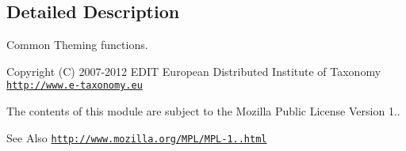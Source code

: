 \subsection{Detailed Description}
Common Theming functions.

\begin{DoxyCopyright}{Copyright}
(C) 2007-\/2012 E\-D\-I\-T European Distributed Institute of Taxonomy \href{http://www.e-taxonomy.eu}{\tt http\-://www.\-e-\/taxonomy.\-eu}
\end{DoxyCopyright}
The contents of this module are subject to the Mozilla Public License Version 1.. \begin{DoxySeeAlso}{See Also}
\href{http://www.mozilla.org/MPL/MPL-1.1.html}{\tt http\-://www.\-mozilla.\-org/\-M\-P\-L/\-M\-P\-L-\/1..\-html} 
\end{DoxySeeAlso}


